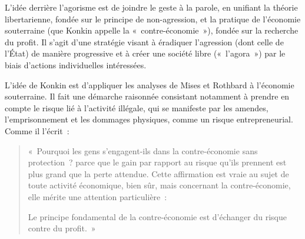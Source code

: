 L'idée derrière l'agorisme est de joindre le geste à la parole, en unifiant la théorie libertarienne, fondée sur le principe de non-agression, et la pratique de l'économie souterraine (que Konkin appelle la «~contre-économie~»), fondée sur la recherche du profit. Il s'agit d'une stratégie visant à éradiquer l'agression (dont celle de l'État) de manière progressive et à créer une société libre («~l'agora~») par le biais d'actions individuelles intéressées.

L'idée de Konkin est d'appliquer les analyses de Mises et Rothbard à l'économie souterraine. Il fait une démarche raisonnée consistant notamment à prendre en compte le risque lié à l'activité illégale, qui se manifeste par les amendes, l'emprisonnement et les dommages physiques, comme un risque entrepreneurial. Comme il l'écrit~:

\begin{quote}
«~Pourquoi les gens s'engagent-ils dans la contre-économie sans protection~? parce que le gain par rapport au risque qu'ils prennent est plus grand que la perte attendue. Cette affirmation est vraie au sujet de toute activité économique, bien sûr, mais concernant la contre-économie, elle mérite une attention particulière~:

Le principe fondamental de la contre-économie est d'échanger du risque contre du profit.~»
\end{quote}


